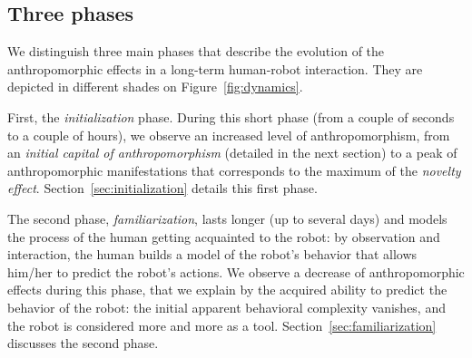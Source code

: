 \documentclass{frontiersSCNS} %
\begin{document}
%
%
%
%

\subsection{Three phases}
\label{sec:phases}

We distinguish three main phases that describe the evolution of the
anthropomorphic effects in a long-term human-robot interaction. They are
depicted in different shades on Figure~\ref{fig:dynamics}.

First, the \emph{initialization} phase. During this short phase (from a couple
of seconds to a couple of hours), we observe an increased level of
anthropomorphism, from an \emph{initial capital of anthropomorphism}
(detailed in the next section) to a peak of anthropomorphic manifestations
that corresponds to the maximum of the \emph{novelty effect}.
Section~\ref{sec:initialization} details this first phase.

The second phase, \emph{familiarization}, lasts longer (up to several days) and
models the process of the human getting acquainted to the robot: by observation
and interaction, the human builds a model of the robot's behavior that allows
him/her to predict the robot's actions. We observe a decrease of
anthropomorphic effects during this phase, that we explain by the acquired
ability to predict the behavior of the robot: the initial apparent behavioral
complexity vanishes, and the robot is considered more and more as a tool.
Section~\ref{sec:familiarization} discusses the second phase.
\end{document}
